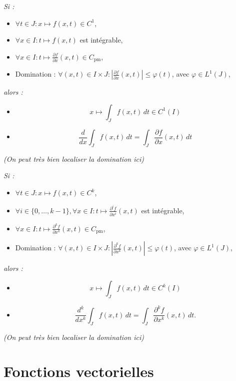\documentclass[a4paper,12pt]{report}
\newcommand{\Thm}[2]{\begin{tcolorbox}[colback=white,colframe=Red!60, title=Théorème : #1]#2\end{tcolorbox}}
\begin{document}
\Thm{Dérivation (classe \( C^1 \) des intégrales à paramètres)}{
\textit{Si :}
\begin{itemize}
    \item[] \( \forall t \in J : x \mapsto f(x,t) \in C^1 \),
    \item[] \( \forall x \in I : t \mapsto f(x,t) \) est intégrable,
    \item[] \( \forall x \in I : t \mapsto \frac{\partial f}{\partial x}(x,t) \in C_{\text{pm}} \),
    \item[] Domination : \( \forall (x,t)\in I \times J : \left| \frac{\partial f}{\partial x}(x,t) \right| \leq \varphi(t) \), avec \( \varphi \in L^1(J) \),
\end{itemize}
\textit{alors :}
\begin{itemize}
    \item[] \[ x \mapsto \int_J f(x,t) \,dt \in C^1(I) \]
    \item[] \[ \frac{d}{dx} \int_J f(x,t)\,dt = \int_J \frac{\partial f}{\partial x}(x,t) \,dt \]
\end{itemize}
\textit{(On peut très bien localiser la domination ici)}
}


\Thm{Dérivation (classe \( C^k \) des intégrales à paramètres)}{
\textit{Si :}
\begin{itemize}
    \item[] \( \forall t \in J : x \mapsto f(x,t) \in C^k \),
    \item[] \( \forall i \in \{0, \ldots, k-1\}, \forall x \in I : t \mapsto \frac{\partial^i f}{\partial x^i}(x,t) \) est intégrable,
    \item[] \( \forall x \in I : t \mapsto \frac{\partial^k f}{\partial x^k}(x,t) \in C_{\text{pm}} \),
    \item[] Domination : \( \forall (x,t) \in I \times J : \left| \frac{\partial^k f}{\partial x^k}(x,t) \right| \leq \varphi(t) \), avec \( \varphi \in L^1(J) \),
\end{itemize}
\textit{alors :}
\begin{itemize}
    \item[] \[ x \mapsto \int_J f(x,t)\,dt \in C^k(I) \]
    \item[] 
    \[
    \frac{d^k}{dx^k} \int_J f(x,t)\,dt = \int_J \frac{\partial^k f}{\partial x^k}(x,t)\,dt.
    \]
\end{itemize}
\textit{(On peut très bien localiser la domination ici)}
}

\section{Fonctions vectorielles}
\end{document}
